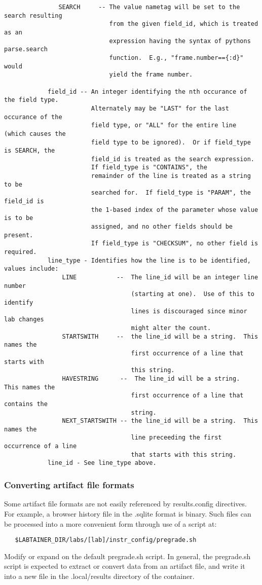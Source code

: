 \documentclass[12pt]{article}
\begin{document}
\begin{verbatim}
               SEARCH     -- The value nametag will be set to the search resulting
                             from the given field_id, which is treated as an
                             expression having the syntax of pythons parse.search 
                             function.  E.g., "frame.number=={:d}" would 
                             yield the frame number.
                              
            field_id -- An integer identifying the nth occurance of the field type.
                        Alternately may be "LAST" for the last occurance of the 
                        field type, or "ALL" for the entire line (which causes the 
                        field type to be ignored).  Or if field_type is SEARCH, the
                        field_id is treated as the search expression. 
                        If field_type is "CONTAINS", the 
                        remainder of the line is treated as a string to be 
                        searched for.  If field_type is "PARAM", the field_id is
                        the 1-based index of the parameter whose value is to be 
                        assigned, and no other fields should be present.
                        If field_type is "CHECKSUM", no other field is required.
            line_type - Identifies how the line is to be identified, values include:
                LINE           --  The line_id will be an integer line number 
                                   (starting at one).  Use of this to identify 
                                   lines is discouraged since minor lab changes 
                                   might alter the count.
                STARTSWITH     --  the line_id will be a string.  This names the 
                                   first occurrence of a line that starts with 
                                   this string. 
                HAVESTRING      --  The line_id will be a string.  This names the 
                                   first occurrence of a line that contains the 
                                   string.
                NEXT_STARTSWITH -- the line_id will be a string.  This names the 
                                   line preceeding the first occurrence of a line 
                                   that starts with this string. 
            line_id - See line_type above.
\end{verbatim}


\subsubsection{Converting artifact file formats}
Some artifact file formats are not easily referenced by results.config directives.
For example, a browser history file in the .sqlite format is binary.  Such files
can be processed into a more convenient form through use of a script at:
\begin{verbatim}
   $LABTAINER_DIR/labs/[lab]/instr_config/pregrade.sh
\end{verbatim}
\noindent Modify or expand on the default pregrade.sh script.
In general, the pregrade.sh script is expected to extract or convert
data from an artifact file, and write it into a new file in the .local/results
directory of the container.   
\end{document}
